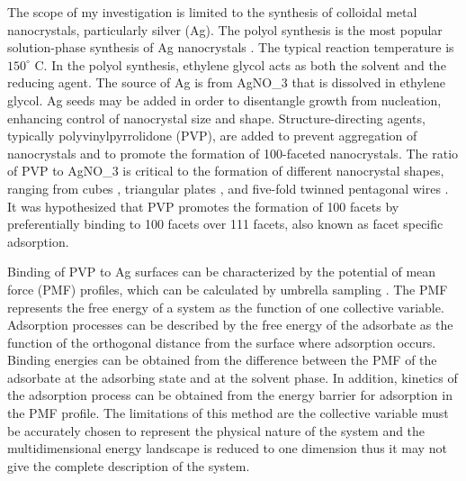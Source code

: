 
The scope of my investigation is limited to the synthesis of colloidal metal nanocrystals, particularly silver (Ag).
The polyol synthesis is the most popular solution-phase synthesis of Ag nanocrystals \cite{Skrabalak_2007}.
The typical reaction temperature is $150^{\circ}$ C.
In the polyol synthesis, ethylene glycol acts as both the solvent and the reducing agent.
The source of Ag is from AgNO_3 that is dissolved in ethylene glycol.
Ag seeds may be added in order to disentangle growth from nucleation, enhancing control of nanocrystal size and shape.
Structure-directing agents, typically polyvinylpyrrolidone (PVP), are added to prevent aggregation of nanocrystals and to promote the formation of {100}-faceted nanocrystals.
The ratio of PVP to AgNO_3 is critical to the formation of different nanocrystal shapes, ranging from cubes \cite{Xia_2012,Zhang_2010}, triangular plates \cite{Lofton_2005,Liu_2012}, and five-fold twinned pentagonal wires \cite{Zhu_2011,Zhang_2008,Sun_2002}.
It was hypothesized that PVP promotes the formation of {100} facets by preferentially binding to {100} facets over {111} facets\cite{Xia_2012,Sun_2002}, also known as facet specific adsorption.

Binding of PVP to Ag surfaces can be characterized by the potential of mean force (PMF) profiles, which can be calculated by umbrella sampling \cite{Torrie_1977,K_stner_2011}.
The PMF represents the free energy of a system as the function of one collective variable.
Adsorption processes can be described by the free energy of the adsorbate as the function of the orthogonal distance from the surface where adsorption occurs.
Binding energies can be obtained from the difference between the PMF of the adsorbate at the adsorbing state and at the solvent phase.
In addition, kinetics of the adsorption process can be obtained from the energy barrier for adsorption in the PMF profile.
The limitations of this method are the collective variable must be accurately chosen to represent the physical nature of the system and the multidimensional energy landscape is reduced to one dimension thus it may not give the complete description of the system.
  